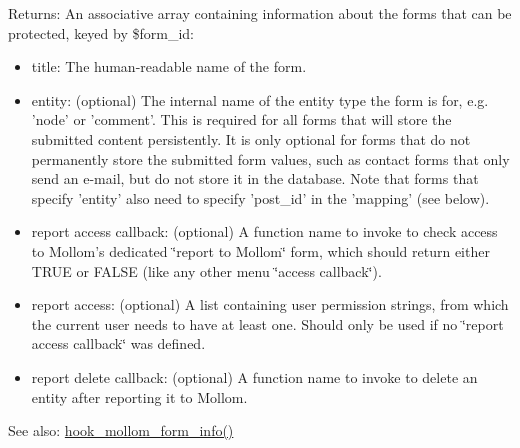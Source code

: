 \begin{Desc}
\item[Returns:]An associative array containing information about the forms that can be protected, keyed by \$form\_\-id:\begin{itemize}
\item title: The human-readable name of the form.\item entity: (optional) The internal name of the entity type the form is for, e.g. 'node' or 'comment'. This is required for all forms that will store the submitted content persistently. It is only optional for forms that do not permanently store the submitted form values, such as contact forms that only send an e-mail, but do not store it in the database. Note that forms that specify 'entity' also need to specify 'post\_\-id' in the 'mapping' (see below).\item report access callback: (optional) A function name to invoke to check access to Mollom's dedicated \char`\"{}report to Mollom\char`\"{} form, which should return either TRUE or FALSE (like any other menu \char`\"{}access callback\char`\"{}).\item report access: (optional) A list containing user permission strings, from which the current user needs to have at least one. Should only be used if no \char`\"{}report access callback\char`\"{} was defined.\item report delete callback: (optional) A function name to invoke to delete an entity after reporting it to Mollom.\end{itemize}
\end{Desc}
\begin{Desc}
\item[See also:]\hyperlink{group__mollom__api_ga5150fd4fabe048cbdeb41ec10908658}{hook\_\-mollom\_\-form\_\-info()} \end{Desc}
